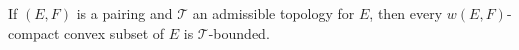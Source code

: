 If $(E,F)$ is a pairing and $\mathcal{T}$ an admissible topology for $E$, then every $w(E,F)$-compact convex subset of $E$ is $\mathcal{T}$-bounded.
